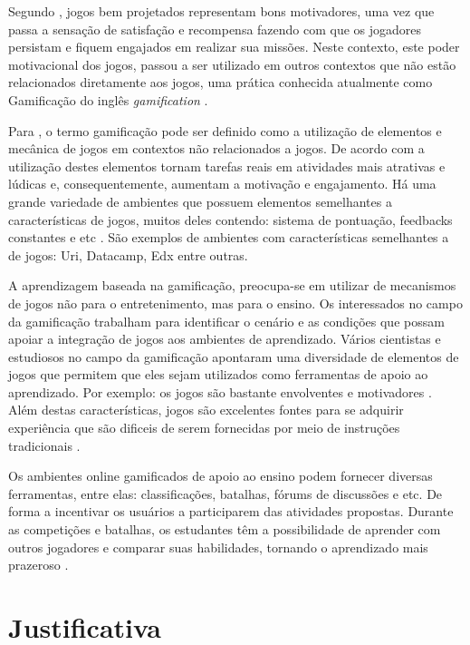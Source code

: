 Segundo \cite{6624228}, jogos bem projetados representam bons motivadores, uma vez que passa a sensação de satisfação
e recompensa fazendo com que os jogadores persistam e fiquem engajados em realizar sua missões. Neste contexto, este poder
motivacional dos jogos, passou a ser utilizado em outros contextos que não estão relacionados diretamente aos jogos, uma prática 
conhecida atualmente como Gamificação do inglês \textit{gamification} {\itshape}.

Para \cite{Deterding:2011:GDE:2181037.2181040}, o termo gamificação pode ser definido como a utilização de elementos e mecânica de 
jogos em contextos não relacionados a jogos. De acordo com \cite{Brazil} a utilização destes elementos tornam tarefas reais em atividades
mais atrativas e lúdicas e, consequentemente, aumentam a motivação e engajamento. Há uma grande variedade de ambientes que possuem 
elementos semelhantes a características de jogos, muitos deles contendo: sistema de pontuação, feedbacks constantes e 
etc \cite{6624228}. São exemplos de ambientes com características semelhantes a de jogos: Uri, Datacamp, Edx entre outras.

A aprendizagem baseada na gamificação, preocupa-se em utilizar de mecanismos de jogos não para o entretenimento,
mas para o ensino. Os interessados no campo da gamificação trabalham para identificar o cenário e as condições 
que possam apoiar a integração de jogos aos ambientes de aprendizado. Vários cientistas e estudiosos no campo
da gamificação apontaram uma diversidade de elementos de jogos que permitem que eles sejam utilizados como
ferramentas de apoio ao aprendizado. Por exemplo: os jogos são bastante envolventes \cite{Dickey2005} e motivadores \cite{Prensky:2003:DGL:950566.950596}. Além destas características,
jogos são excelentes fontes para se adquirir experiência que são dificeis de serem fornecidas por meio de instruções tradicionais \cite{Arena2014}.

Os ambientes online gamificados de apoio ao ensino podem fornecer diversas ferramentas, entre elas: classificações, batalhas, fórums de discussões e etc.
De forma a incentivar os usuários a participarem das atividades propostas. 
Durante as competições e batalhas, os estudantes têm a possibilidade de aprender com outros jogadores e comparar suas habilidades, tornando o aprendizado mais
prazeroso \cite{LearningProgramming}. 

\section{Justificativa}

